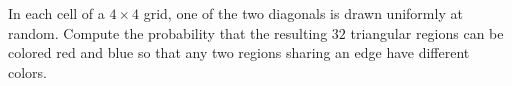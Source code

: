 In each cell of a $4 \times 4$ grid, one of the two diagonals is drawn uniformly at random. Compute the probability that the resulting $32$ triangular regions can be colored red and blue so that any two regions sharing an edge have different colors.